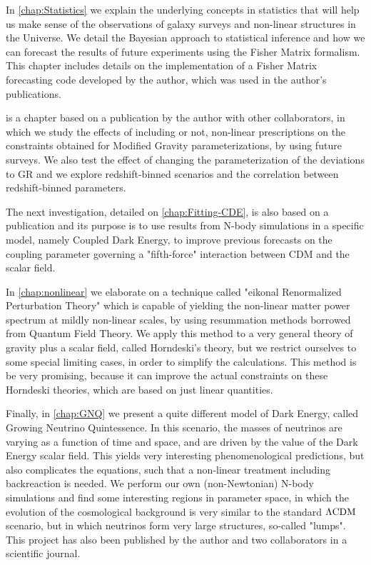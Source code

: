 In \cref{chap:Statistics} we explain the underlying concepts in statistics that will help us
make sense of the observations of galaxy surveys and non-linear structures in the Universe.
We detail the Bayesian approach to statistical inference and how we can forecast the results of future 
experiments using the Fisher Matrix formalism. This chapter includes details on the implementation
of a Fisher Matrix forecasting code developed by the author, which was used in the author's publications.

 is a chapter based on a publication by the author with other collaborators, in which we study the effects of including or not, non-linear prescriptions on the constraints obtained for Modified Gravity parameterizations, by using future surveys. We also test the effect of changing the parameterization of the deviations to GR and we explore redshift-binned scenarios and the correlation between redshift-binned parameters.

The next investigation, detailed on \cref{chap:Fitting-CDE}, is also based on a publication and its purpose 
is to use results from N-body simulations in a specific model, namely Coupled Dark Energy, to improve 
previous forecasts on the coupling parameter governing a "fifth-force" interaction between CDM and 
the scalar field.

In \cref{chap:nonlinear} we elaborate on a technique called "eikonal Renormalized Perturbation Theory"
which is capable of yielding the non-linear matter power spectrum at mildly non-linear scales, by using resummation methods borrowed from Quantum Field Theory. 
We apply this method to a very general theory of gravity plus a scalar field, called Horndeski's theory, but we restrict ourselves to some special limiting cases, in order to  simplify the calculations. This  method
is be very promising, because it can improve the actual constraints on these Horndeski theories, which are based on just linear quantities.

Finally, in \cref{chap:GNQ} we present a quite different model of Dark Energy, called Growing Neutrino Quintessence. In this scenario, the masses of neutrinos are varying as a function of time and space, and are driven by the value of the Dark Energy scalar field. This yields very interesting phenomenological predictions, but also complicates the equations, such that a non-linear treatment including backreaction is needed. We perform our own (non-Newtonian) N-body simulations and find some interesting regions in parameter space, in which the evolution of the cosmological background is very similar to the standard $\Lambda\mathrm{CDM}$ scenario, but in which neutrinos form very large structures, so-called "lumps". This project has also been published
by the author and two collaborators in a scientific journal.

%
%







 
